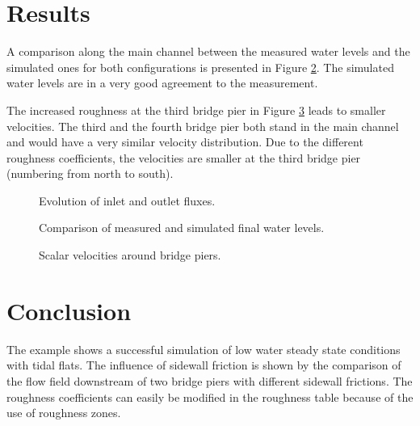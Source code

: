\section{Results}
A comparison along the main channel between the measured water levels and the
simulated ones for both configurations is presented in Figure
\ref{t2d:donau:diff_waterlevels}.
The simulated water levels are in a very good agreement to the measurement.

The increased roughness at the third bridge pier in Figure
\ref{t2d:donau:final_flow} leads to smaller velocities.
The third and the fourth bridge pier both stand in the main channel and would
have a very similar velocity distribution.
Due to the different roughness coefficients, the velocities are smaller
at the third bridge pier (numbering from north to south).

\begin{figure} [h!]
\centering
{}
\caption{Evolution of inlet and outlet fluxes.}
\label{t2d:donau:fluxes}
\end{figure}


\begin{figure} [h!]
\centering
{}
\caption{Comparison of measured and simulated final water levels.}
\label{t2d:donau:diff_waterlevels}
\end{figure}

\begin{figure} [h!]
\centering
{}
\caption{Scalar velocities around bridge piers.}
\label{t2d:donau:final_flow}
\end{figure}

\section{Conclusion}
The example shows a successful simulation of low water steady state conditions
with tidal flats.
The influence of sidewall friction is shown by the comparison of the flow field
downstream of two bridge piers with different sidewall frictions.
The roughness coefficients can easily be modified in the roughness table because
of the use of roughness zones.



